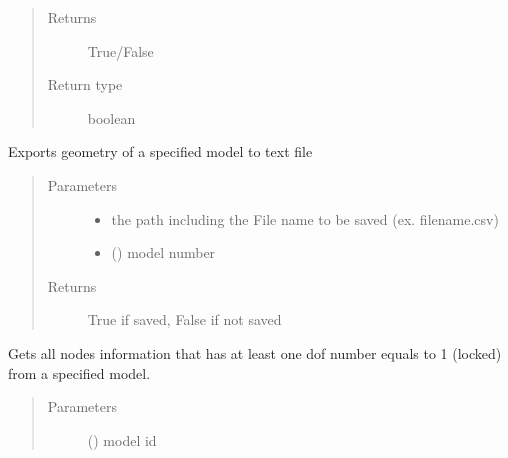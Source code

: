 \documentclass[letterpaper,10pt,english]{sphinxmanual}
\begin{document}
\begin{fulllineitems}
\begin{fulllineitems}
\begin{quote}
\begin{description}
\item[{Returns}] \leavevmode
True/False

\item[{Return type}] \leavevmode
boolean

\end{description}\end{quote}

\end{fulllineitems}


\begin{fulllineitems}
\label{\detokenize{api:beamon.database.database.Database.export_text}}
Exports geometry of a specified model to text file
\begin{quote}\begin{description}
\item[{Parameters}] \leavevmode\begin{itemize}
\item {} 
 \textendash{} the path including the File name to be saved (ex. filename.csv)

\item {} 
 () \textendash{} model number

\end{itemize}

\item[{Returns}] \leavevmode
True if saved, False if not saved

\end{description}\end{quote}

\end{fulllineitems}


\begin{fulllineitems}
\label{\detokenize{api:beamon.database.database.Database.get_all_dof}}
Gets all nodes information that has at least one dof number equals to 1 (locked) from a specified model.
\begin{quote}\begin{description}
\item[{Parameters}] \leavevmode
{} () \textendash{} model id


\end{description}
\end{quote}
\end{fulllineitems}
\end{fulllineitems}
\end{document}
